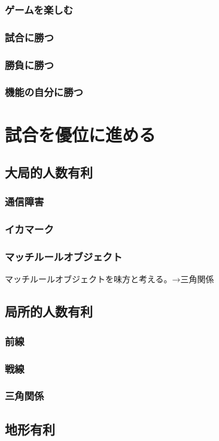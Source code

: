 \documentclass[a4paper,11pt]{jsbook}
\begin{document}
\section{ゲームを楽しむ}
\section{試合に勝つ}
\section{勝負に勝つ}
\section{機能の自分に勝つ}


\part{試合を優位に進める}
\chapter{大局的人数有利}
\section{通信障害}
\section{イカマーク}
\section{マッチルールオブジェクト}
マッチルールオブジェクトを味方と考える。→三角関係

\chapter{局所的人数有利}
\section{前線}
\section{戦線}
\section{三角関係}
\chapter{地形有利}
\end{document}
